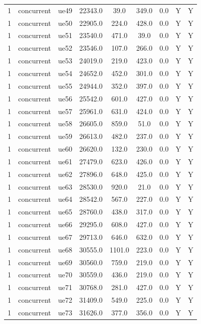 \begin{table}[ht]
\begin{tabular}{|c|c|c|c|c|c|c|c|c|}
1 & concurrent & ue49 & 22343.0 & 39.0 & 349.0 & 0.0 & Y & Y \\
1 & concurrent & ue50 & 22905.0 & 224.0 & 428.0 & 0.0 & Y & Y \\
1 & concurrent & ue51 & 23540.0 & 471.0 & 39.0 & 0.0 & Y & Y \\
1 & concurrent & ue52 & 23546.0 & 107.0 & 266.0 & 0.0 & Y & Y \\
1 & concurrent & ue53 & 24019.0 & 219.0 & 423.0 & 0.0 & Y & Y \\
1 & concurrent & ue54 & 24652.0 & 452.0 & 301.0 & 0.0 & Y & Y \\
1 & concurrent & ue55 & 24944.0 & 352.0 & 397.0 & 0.0 & Y & Y \\
1 & concurrent & ue56 & 25542.0 & 601.0 & 427.0 & 0.0 & Y & Y \\
1 & concurrent & ue57 & 25961.0 & 631.0 & 424.0 & 0.0 & Y & Y \\
1 & concurrent & ue58 & 26605.0 & 859.0 & 51.0 & 0.0 & Y & Y \\
1 & concurrent & ue59 & 26613.0 & 482.0 & 237.0 & 0.0 & Y & Y \\
1 & concurrent & ue60 & 26620.0 & 132.0 & 230.0 & 0.0 & Y & Y \\
1 & concurrent & ue61 & 27479.0 & 623.0 & 426.0 & 0.0 & Y & Y \\
1 & concurrent & ue62 & 27896.0 & 648.0 & 425.0 & 0.0 & Y & Y \\
1 & concurrent & ue63 & 28530.0 & 920.0 & 21.0 & 0.0 & Y & Y \\
1 & concurrent & ue64 & 28542.0 & 567.0 & 227.0 & 0.0 & Y & Y \\
1 & concurrent & ue65 & 28760.0 & 438.0 & 317.0 & 0.0 & Y & Y \\
1 & concurrent & ue66 & 29295.0 & 608.0 & 427.0 & 0.0 & Y & Y \\
1 & concurrent & ue67 & 29713.0 & 646.0 & 632.0 & 0.0 & Y & Y \\
1 & concurrent & ue68 & 30555.0 & 1101.0 & 223.0 & 0.0 & Y & Y \\
1 & concurrent & ue69 & 30560.0 & 759.0 & 219.0 & 0.0 & Y & Y \\
1 & concurrent & ue70 & 30559.0 & 436.0 & 219.0 & 0.0 & Y & Y \\
1 & concurrent & ue71 & 30768.0 & 281.0 & 427.0 & 0.0 & Y & Y \\
1 & concurrent & ue72 & 31409.0 & 549.0 & 225.0 & 0.0 & Y & Y \\
1 & concurrent & ue73 & 31626.0 & 377.0 & 356.0 & 0.0 & Y & Y \\

\end{tabular}
\end{table}
